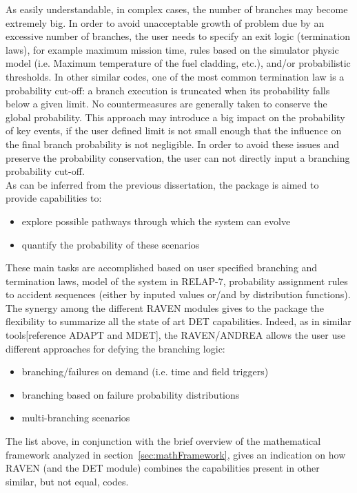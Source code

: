 \documentclass{mc2013}
\begin{document}
As easily understandable, in complex cases, the number of branches may become extremely big. In order to avoid unacceptable growth of problem due by an excessive number of branches, the user needs to specify an exit logic (termination laws), for example maximum mission time, rules based on the simulator physic model (i.e. Maximum temperature of the fuel cladding, etc.), and/or probabilistic thresholds. In other similar codes, one of the most common termination law is a probability cut-off: a branch execution is truncated when its probability falls below a given limit. No countermeasures are generally taken to conserve the global probability. This approach may introduce a big impact on the probability of key events, if the user defined limit is not small enough that the influence on the final branch probability is not negligible.  In order to avoid these issues and preserve the probability conservation, the user can not directly input a branching probability cut-off. 
\\ As can be inferred from the previous dissertation, the package is aimed to provide capabilities to:
\vspace{-5mm}
\begin{itemize}
\itemsep0em
\item explore possible pathways through which the system can evolve
\item quantify the probability of these scenarios
\end{itemize}
\vspace{-5mm}
These main tasks are accomplished based on user specified branching and termination laws, model of the system in RELAP-7, probability assignment rules to accident sequences (either by inputed values or/and by distribution functions).
The synergy among the different RAVEN modules gives to the package the flexibility to summarize all the state of art DET capabilities. Indeed, as in similar tools[reference ADAPT and MDET], the RAVEN/ANDREA allows the user use different approaches for defying the branching logic:
\vspace{-5mm}
\begin{itemize}
\itemsep0em
\item branching/failures on demand (i.e. time and field triggers)
\item branching based on failure probability distributions
\item multi-branching scenarios
\end{itemize}
\vspace{-5mm}
The list above, in conjunction with the brief overview of the mathematical framework analyzed in section~\ref{sec:mathFramework}, gives an indication on how RAVEN (and the DET module) combines the capabilities present in other similar, but not equal, codes.  
\end{document}
